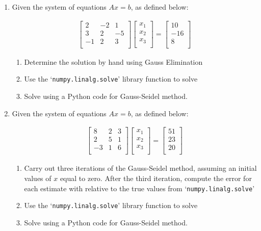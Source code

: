 \documentclass[a4paper,12pt]{article}
\begin{document}
\begin{enumerate}
	
	
	\item Given the system of equations $Ax = b$, as defined below:
	
	\begin{align*}
	\begin{bmatrix}
	2 & -2 & 1 \\
	3 & 2 & -5 \\
	-1 & 2 & 3 \\
	\end{bmatrix}
	\begin{bmatrix}
	x_1 \\
	x_2 \\
	x_3 \\
	\end{bmatrix}
	=
	\begin{bmatrix}
	10 \\
	-16 \\
	8 \\
	\end{bmatrix}
	\end{align*}
	\begin{enumerate}
		\item Determine the solution by hand using Gauss Elimination
		\item Use the `\verb|numpy.linalg.solve|' library function to solve
		\item Solve using a Python code for Gauss-Seidel method.
	\end{enumerate}

	
	\item Given the system of equations $Ax = b$, as defined below:

	\begin{align*}
	\begin{bmatrix}
	8 & 2 & 3 \\
	2 & 5 & 1 \\
	-3 & 1 & 6 \\
	\end{bmatrix}
	\begin{bmatrix}
	x_1 \\
	x_2 \\
	x_3 \\
	\end{bmatrix}
	=
	\begin{bmatrix}
	51 \\
	23 \\
	20 \\
	\end{bmatrix}
	\end{align*}
	\begin{enumerate}
		\item Carry out three iterations of the Gauss-Seidel method, assuming an initial values of $x$ equal to zero. After the third iteration, compute the error for each estimate with relative to the true values from `\verb|numpy.linalg.solve|'
		\item Use the `\verb|numpy.linalg.solve|' library function to solve
		\item Solve using a Python code for Gauss-Seidel method.
	\end{enumerate}


\end{enumerate}
\end{document}
